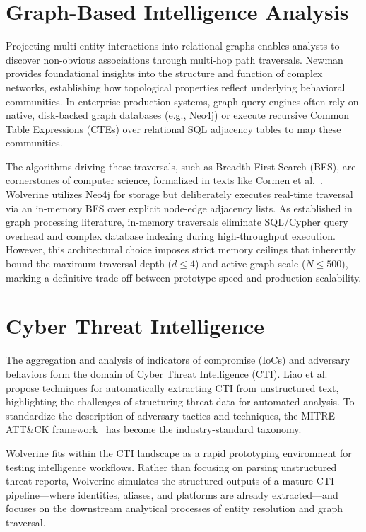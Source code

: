 \section{Graph-Based Intelligence Analysis}
\label{sec:related-graph-traversal}
Projecting multi-entity interactions into relational graphs enables analysts to discover non-obvious associations through multi-hop path traversals. Newman~\cite{newman2003structure} provides foundational insights into the structure and function of complex networks, establishing how topological properties reflect underlying behavioral communities. In enterprise production systems, graph query engines often rely on native, disk-backed graph databases (e.g., Neo4j) or execute recursive Common Table Expressions (CTEs) over relational SQL adjacency tables to map these communities.

The algorithms driving these traversals, such as Breadth-First Search (BFS), are cornerstones of computer science, formalized in texts like Cormen et al.~\cite{cormen2009introduction}. Wolverine utilizes Neo4j for storage but deliberately executes real-time traversal via an in-memory BFS over explicit node-edge adjacency lists. As established in graph processing literature, in-memory traversals eliminate SQL/Cypher query overhead and complex database indexing during high-throughput execution. However, this architectural choice imposes strict memory ceilings that inherently bound the maximum traversal depth ($d \le 4$) and active graph scale ($N \le 500$), marking a definitive trade-off between prototype speed and production scalability.

\section{Cyber Threat Intelligence}
\label{sec:related-cti}
The aggregation and analysis of indicators of compromise (IoCs) and adversary behaviors form the domain of Cyber Threat Intelligence (CTI). Liao et al.~\cite{liao2016acing} propose techniques for automatically extracting CTI from unstructured text, highlighting the challenges of structuring threat data for automated analysis. To standardize the description of adversary tactics and techniques, the MITRE ATT\&CK framework~\cite{mitre2024attack} has become the industry-standard taxonomy.

Wolverine fits within the CTI landscape as a rapid prototyping environment for testing intelligence workflows. Rather than focusing on parsing unstructured threat reports, Wolverine simulates the structured outputs of a mature CTI pipeline—where identities, aliases, and platforms are already extracted—and focuses on the downstream analytical processes of entity resolution and graph traversal.

